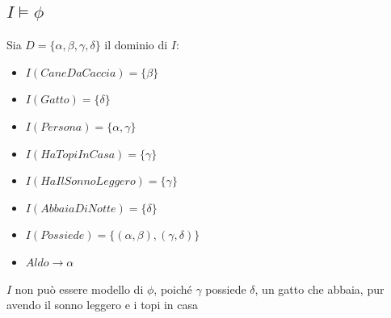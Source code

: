 \documentclass[a4paper, 12pt]{article}
\begin{document}
\subsection{$ I \models \phi $}

Sia $D = \{\alpha, \beta, \gamma, \delta \}$ il dominio di $I$:
\begin{itemize}[label=-]
    \item $ I(CaneDaCaccia) = \{ \beta \} $
    \item $ I(Gatto) = \{ \delta \} $
    \item $ I(Persona) = \{ \alpha, \gamma \} $
    \item $ I(HaTopiInCasa) = \{ \gamma \} $
    \item $ I(HaIlSonnoLeggero) = \{ \gamma \} $
    \item $ I(AbbaiaDiNotte) = \{ \delta \} $
    \item $ I(Possiede) = \{(\alpha, \beta), (\gamma, \delta)\} $
    \item $ Aldo \rightarrow \alpha $
\end{itemize}
$I$ non può essere modello di $\phi$, poiché $\gamma$ possiede $\delta$, un gatto
che abbaia, pur avendo il sonno leggero e i topi in casa
\end{document}
